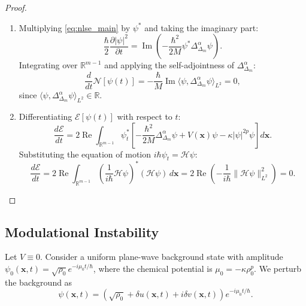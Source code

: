 \documentclass[11pt,a4paper]{article}
\theoremstyle{plain}
\theoremstyle{definition}
\theoremstyle{remark}
\numberwithin{equation}{section}
\begin{document}
\begin{proof}
\leavevmode
\begin{enumerate}
    \item Multiplying \eqref{eq:nlse_main} by $\psi^*$ and taking the imaginary part:
    \begin{equation}
    \frac{\hbar}{2}\frac{\partial |\psi|^2}{\partial t} = \operatorname{Im}\left(-\frac{\hbar^2}{2M}\psi^* \Delta_{\Delta_m}^\alpha \psi\right).
    \end{equation}
    Integrating over $\mathbb{R}^{m-1}$ and applying the self-adjointness of $\Delta_{\Delta_m}^\alpha$:
    \begin{equation}
    \frac{d}{dt}\mathcal{N}[\psi(t)] = -\frac{\hbar}{M}\operatorname{Im}\langle \psi, \Delta_{\Delta_m}^\alpha \psi \rangle_{L^2} = 0,
    \end{equation}
    since $\langle \psi, \Delta_{\Delta_m}^\alpha \psi \rangle_{L^2} \in \mathbb{R}$.
    
    \item Differentiating $\mathcal{E}[\psi(t)]$ with respect to $t$:
    \begin{equation}
    \frac{d\mathcal{E}}{dt} = 2\operatorname{Re}\int_{\mathbb{R}^{m-1}} \psi_t^* \left[ -\frac{\hbar^2}{2M}\Delta_{\Delta_m}^\alpha \psi + V(\mathbf{x})\psi - \kappa |\psi|^{2p}\psi \right] d\mathbf{x}.
    \end{equation}
    Substituting the equation of motion $i\hbar \psi_t = \mathcal{H}\psi$:
    \begin{equation}
    \frac{d\mathcal{E}}{dt} = 2\operatorname{Re}\int_{\mathbb{R}^{m-1}} \left(\frac{1}{i\hbar}\mathcal{H}\psi\right)^* (\mathcal{H}\psi) \, d\mathbf{x} = 2\operatorname{Re}\left(-\frac{1}{i\hbar}\|\mathcal{H}\psi\|_{L^2}^2\right) = 0.
    \end{equation}
\end{enumerate}
\end{proof}

\subsection{Modulational Instability}

Let $V \equiv 0$. Consider a uniform plane-wave background state with amplitude $\psi_0(\mathbf{x}, t) = \sqrt{\rho_0} e^{-i \mu_0 t / \hbar}$, where the chemical potential is $\mu_0 = -\kappa \rho_0^p$. We perturb the background as
\begin{equation}
\psi(\mathbf{x}, t) = \left(\sqrt{\rho_0} + \delta u(\mathbf{x}, t) + i \delta v(\mathbf{x}, t)\right) e^{-i \mu_0 t / \hbar}.
\end{equation}
\end{document}
